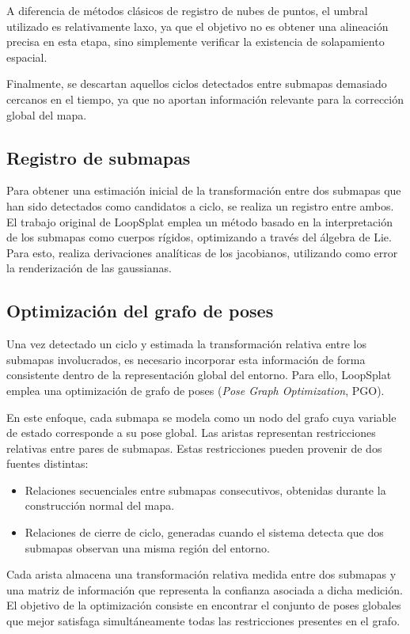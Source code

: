 A diferencia de métodos clásicos de registro de nubes de puntos, el umbral utilizado es relativamente laxo, ya que el objetivo no es obtener una alineación precisa en esta etapa, sino simplemente verificar la existencia de solapamiento espacial.

Finalmente, se descartan aquellos ciclos detectados entre submapas demasiado cercanos en el tiempo, ya que no aportan información relevante para la corrección global del mapa.


\subsection{Registro de submapas}

Para obtener una estimación inicial de la transformación entre dos submapas que han sido detectados como candidatos a ciclo, se realiza un registro entre ambos. El trabajo original de LoopSplat emplea un método basado en la interpretación de los submapas como cuerpos rígidos, optimizando a través del álgebra de Lie. Para esto, realiza derivaciones analíticas de los jacobianos, utilizando como error la renderización de las gaussianas.

\subsection{Optimización del grafo de poses}

Una vez detectado un ciclo y estimada la transformación relativa entre los submapas involucrados, es necesario incorporar esta información de forma consistente dentro de la representación global del entorno. Para ello, LoopSplat emplea una optimización de grafo de poses (\textit{Pose Graph Optimization}, PGO).

En este enfoque, cada submapa se modela como un nodo del grafo cuya variable de estado corresponde a su pose global. Las aristas representan restricciones relativas entre pares de submapas. Estas restricciones pueden provenir de dos fuentes distintas:

\begin{itemize}
\item Relaciones secuenciales entre submapas consecutivos, obtenidas durante la construcción normal del mapa.
\item Relaciones de cierre de ciclo, generadas cuando el sistema detecta que dos submapas observan una misma región del entorno.
\end{itemize}

Cada arista almacena una transformación relativa medida entre dos submapas y una matriz de información que representa la confianza asociada a dicha medición. El objetivo de la optimización consiste en encontrar el conjunto de poses globales que mejor satisfaga simultáneamente todas las restricciones presentes en el grafo.


